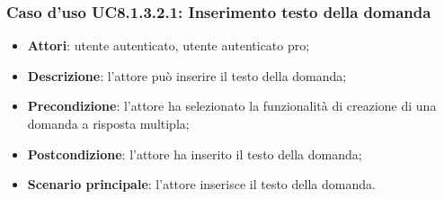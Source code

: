 \subsubsection{Caso d'uso UC8.1.3.2.1: Inserimento testo della domanda}
	\begin{itemize}
		\item
			\textbf{Attori}: utente autenticato, utente autenticato pro;
		\item		
			\textbf{Descrizione}: l'attore può inserire il testo della domanda;
		\item
			\textbf{Precondizione}: l'attore ha selezionato la funzionalità di creazione di una domanda a risposta multipla; 
		\item
			\textbf{Postcondizione}: l'attore ha inserito il testo della domanda;
		\item
			\textbf{Scenario principale}: l'attore inserisce il testo della domanda. 
	 			
	\end{itemize}
	
